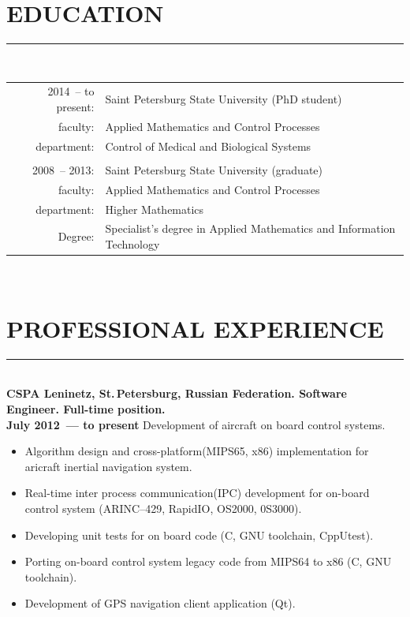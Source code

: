 \documentclass[a4paper,oneside,12pt]{article}
\newcommand{\cvpart}[1]{%
\vspace{-0.9em}%
\section*{\Large\bfseries\MakeTextUppercase{#1}}%
\vspace{-1.7em}%
\rule{\linewidth}{0.3em}\\[-0.8em]%
}
\begin{document}
\pagebreak

\cvpart{Education}

\begin{tabularx}{\linewidth}{rX}
2014~-- to present:& Saint Petersburg State University (PhD student)\\
           faculty:& Applied Mathematics and Control Processes\\
        department:& Control of Medical and Biological Systems\\
                   & \\
      2008~-- 2013:& Saint Petersburg State University (graduate)\\
           faculty:& Applied Mathematics and Control Processes\\
        department:& Higher Mathematics\\
            Degree:& Specialist's degree in Applied Mathematics and Information Technology
\end{tabularx}

~\\

\cvpart{Professional Experience}

{\bf
CSPA Leninetz, St.\,Petersburg, Russian Federation. Software Engineer. Full-time position.\\
July 2012~--- to present
}
Development of aircraft on board control systems.

\begin{itemize}
    \item Algorithm design and cross-platform(MIPS65, x86)  implementation for aricraft inertial navigation system.
    \item Real-time inter process communication(IPC) development for on-board control system (ARINC--429, RapidIO, OS2000, 0S3000).
    \item Developing unit tests for on board code (C, GNU toolchain, CppUtest).
    \item Porting on-board control system legacy code from MIPS64 to x86 (C, GNU toolchain).
    \item Development of GPS navigation client application (Qt). 
\end{itemize}

~\\[-1em]
\end{document}
